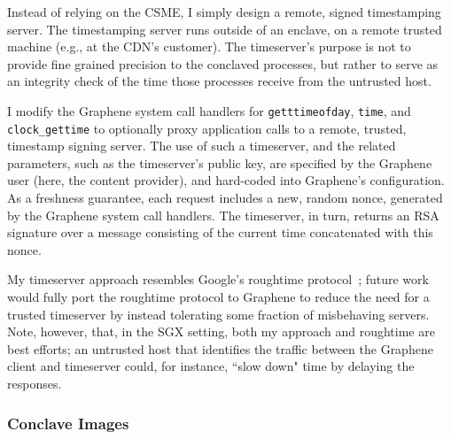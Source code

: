 Instead of relying on the CSME, I simply design a remote, signed
timestamping server.
%
The timestamping server runs outside of an enclave, on a remote trusted
machine (e.g., at the CDN's customer).
%
The timeserver's purpose is not to provide fine grained precision to
the conclaved processes, but rather to serve as an integrity check of
the time those processes receive from the untrusted host.

I modify the Graphene system call handlers for \texttt{getttimeofday},
\texttt{time}, and \texttt{clock\_gettime} to optionally proxy application
calls to a remote, trusted, timestamp signing server.
%
The use of such a timeserver, and the related parameters, such as the
timeserver's public key, are specified by the Graphene user (here, the content
provider), and hard-coded into Graphene's configuration.
%
As a freshness guarantee, each request includes a new, random
nonce, generated by the Graphene system call handlers.
%
The timeserver, in turn, returns an RSA signature over a message
consisting of the current time concatenated with this nonce.




My timeserver approach resembles Google's roughtime protocol~\cite{roughtime};
future work would fully port the roughtime protocol to Graphene to reduce the
need for a trusted timeserver by instead tolerating some fraction of
misbehaving servers.
%
Note, however, that, in the SGX setting, both my approach and roughtime are best
efforts; an untrusted host that identifies the traffic between the Graphene
client and timeserver could, for instance, ``slow down" time by delaying the
responses.



\subsubsection{Conclave Images} %

